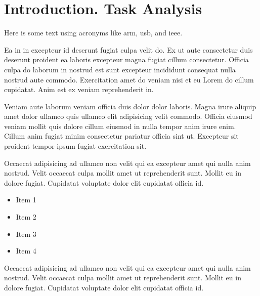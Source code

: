 \documentclass{thesis}
\let\oldsection\section
\renewcommand{\section}{\clearpage\oldsection}
\begin{document}






\printglossary[type=\acronymtype, style=mcolindex]


\listoffigures   %
\listoftables    %


\section{Introduction. Task Analysis}

Here is some text using acronyms like \acrshort{arm}, \acrlong{usb}, and \acrfull{ieee}.

Ea in in excepteur id deserunt fugiat culpa velit do. Ex ut aute consectetur
duis deserunt proident ea laboris excepteur magna fugiat cillum consectetur.
Officia culpa do laborum in nostrud est sunt excepteur incididunt consequat
nulla nostrud aute commodo. Exercitation amet do veniam nisi et eu Lorem do
cillum cupidatat. Anim est ex veniam reprehenderit in.

Veniam aute laborum veniam officia duis dolor dolor laboris. Magna irure aliquip
amet dolor ullamco quis ullamco elit adipisicing velit commodo. Officia eiusmod
veniam mollit quis dolore cillum eiusmod in nulla tempor anim irure enim. Cillum
anim fugiat minim consectetur pariatur officia sint ut. Excepteur sit proident
tempor ipsum fugiat exercitation sit.

Occaecat adipisicing ad ullamco non velit qui ea excepteur amet qui nulla anim
nostrud. Velit occaecat culpa mollit amet ut reprehenderit sunt. Mollit eu in
dolore fugiat. Cupidatat voluptate dolor elit cupidatat officia id.

\begin{itemize}
    \item Item 1
    \item Item 2
    \item Item 3
    \item Item 4
\end{itemize}

Occaecat adipisicing ad ullamco non velit qui ea excepteur amet qui nulla anim
nostrud. Velit occaecat culpa mollit amet ut reprehenderit sunt. Mollit eu in
dolore fugiat. Cupidatat voluptate dolor elit cupidatat officia id.
\end{document}
